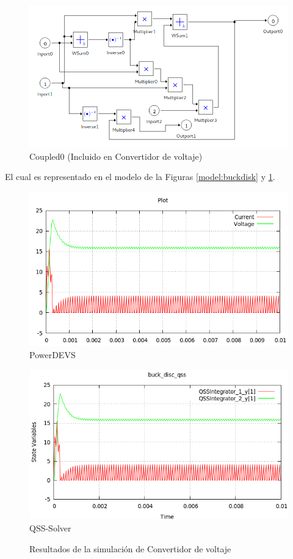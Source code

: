 \begin{figure}[H]
\includegraphics[width=0.75\linewidth]{buck_disk_coupled0}
\caption{Coupled0 (Incluido en Convertidor de voltaje)}\label{model:buckdiskcoupled0}
\end{figure}

El cual es representado en el modelo de la Figuras \ref{model:buckdisk} y \ref{model:buckdiskcoupled0}.

\begin{figure}[H]
\begin{minipage}{0.5\textwidth}
 \includegraphics[width=\linewidth]{buck_disk-pd}
\centering
PowerDEVS
\end{minipage}\hfill
\begin{minipage}{0.5\textwidth}
 \includegraphics[width=\linewidth]{buck_disk-qss}
\centering
QSS-Solver
\end{minipage}
\caption{Resultados de la simulación de Convertidor de voltaje}
\label{result:buckdisk}
\end{figure}

